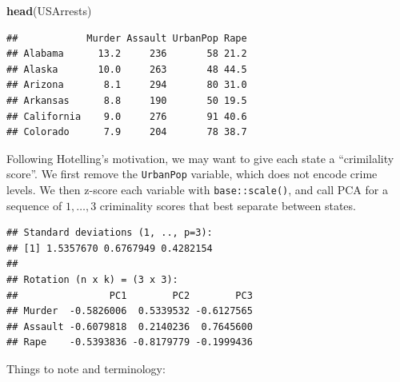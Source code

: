 \documentclass[]{book}
\newenvironment{Shaded}{\begin{snugshade}}{\end{snugshade}}
\newcommand{\DataTypeTok}[1]{\textcolor[rgb]{0.13,0.29,0.53}{#1}}
\newcommand{\DecValTok}[1]{\textcolor[rgb]{0.00,0.00,0.81}{#1}}
\newcommand{\FloatTok}[1]{\textcolor[rgb]{0.00,0.00,0.81}{#1}}
\newcommand{\KeywordTok}[1]{\textcolor[rgb]{0.13,0.29,0.53}{\textbf{#1}}}
\newcommand{\NormalTok}[1]{#1}
\newcommand{\OperatorTok}[1]{\textcolor[rgb]{0.81,0.36,0.00}{\textbf{#1}}}
\newcommand{\OtherTok}[1]{\textcolor[rgb]{0.56,0.35,0.01}{#1}}
\newcommand{\StringTok}[1]{\textcolor[rgb]{0.31,0.60,0.02}{#1}}
\theoremstyle{definition}
\theoremstyle{definition}
\theoremstyle{definition}
\theoremstyle{remark}
\begin{document}
\begin{Shaded}
\begin{Highlighting}[]
\KeywordTok{head}\NormalTok{(USArrests)}
\end{Highlighting}
\end{Shaded}

\begin{verbatim}
##            Murder Assault UrbanPop Rape
## Alabama      13.2     236       58 21.2
## Alaska       10.0     263       48 44.5
## Arizona       8.1     294       80 31.0
## Arkansas      8.8     190       50 19.5
## California    9.0     276       91 40.6
## Colorado      7.9     204       78 38.7
\end{verbatim}

Following Hotelling's motivation, we may want to give each state a ``crimilality score''.
We first remove the \texttt{UrbanPop} variable, which does not encode crime levels.
We then z-score each variable with \texttt{base::scale()}, and call PCA for a sequence of \(1,\dots,3\) criminality scores that best separate between states.

\begin{Shaded}
\end{Shaded}

\begin{verbatim}
## Standard deviations (1, .., p=3):
## [1] 1.5357670 0.6767949 0.4282154
## 
## Rotation (n x k) = (3 x 3):
##                PC1        PC2        PC3
## Murder  -0.5826006  0.5339532 -0.6127565
## Assault -0.6079818  0.2140236  0.7645600
## Rape    -0.5393836 -0.8179779 -0.1999436
\end{verbatim}

Things to note and terminology:
\end{document}
